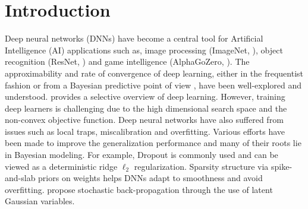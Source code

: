 \documentclass[ba]{imsart}
\numberwithin{equation}{section}
\theoremstyle{plain}
\begin{document}
\section{Introduction}

Deep neural networks (DNNs) have become a central tool for Artificial Intelligence (AI) applications such as, image processing (ImageNet, \citet{krizhevsky2012imagenet}), object recognition (ResNet, \citet{he2016deep}) and game intelligence (AlphaGoZero, \citet{silver2016mastering}). The approximability \citep{poggio2017and,bauer2017deep} and rate of convergence of  deep learning, either in the frequentist fashion \citep{schmidt2017nonparametric} or  from a Bayesian predictive point of view \citep{polson2018posterior, wang2020uncertainty},  have been well-explored and understood. \citet{fan2021selective} provides  a selective overview of deep learning. However, training deep learners is challenging due to the high dimensional search space and the non-convex objective function. Deep neural networks have also suffered from issues such as local traps, miscalibration and overfitting. Various efforts have been made to improve the generalization performance and many of  their roots lie in Bayesian modeling. For example, Dropout \citep{wager2013dropout} is commonly used  and  can be viewed as a deterministic ridge $\ell_2$ regularization. Sparsity structure via spike-and-slab priors \citep{polson2018posterior} on weights helps DNNs adapt to smoothness and avoid overfitting.  \citet{rezende2014stochastic} propose stochastic back-propagation through the use  of latent Gaussian variables.  
\end{document}
